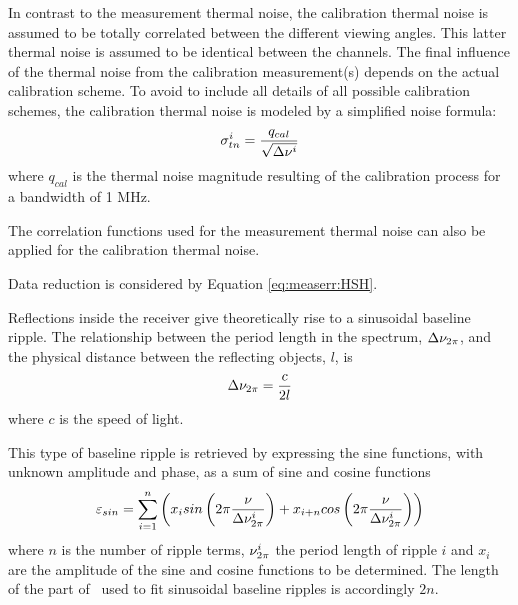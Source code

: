  \label{sec:measerr:ctn}
 
 In contrast to the measurement thermal noise, the calibration thermal
 noise is assumed to be totally correlated between the different
 viewing angles.  This latter thermal noise is assumed to be identical
 between the channels.  The final influence of the thermal noise from
 the calibration measurement(s) depends on the actual calibration
 scheme.  To avoid to include all details of all possible calibration
 schemes, the calibration thermal noise is modeled by a simplified
 noise formula:
 \begin{equation}
   \sigma_{tn}^i = \frac{q_{cal}}{\sqrt{\Delta \nu^i}}
 \end{equation}
 where $q_{cal}$ is the thermal noise magnitude resulting of the calibration
 process for a bandwidth of 1 MHz.

 The correlation functions used for the measurement thermal noise can
 also be applied for the calibration thermal noise.  
 
 Data reduction is considered by Equation \ref{eq:measerr:HSH}.
 


 \label{sec:measerr:sin}
 
 Reflections inside the receiver give theoretically rise to a
 sinusoidal baseline ripple. The relationship between the period
 length in the spectrum, $\Delta \nu_{2\pi}$, and the physical distance
 between the reflecting objects, $l$, is \citep{rohlfs:86} 
 \begin{equation}
   \Delta \nu_{2\pi} = \frac{c}{2l}
 \end{equation}
 where $c$ is the speed of light.
 
 This type of baseline ripple is retrieved by expressing the sine
 functions, with unknown amplitude and phase, as a sum of sine and
 cosine functions \citep{kuntz:97}
 \begin{equation}
   \varepsilon_{sin} = \sum_{i=1}^n \left( 
              x_i sin\left(2\pi\frac{\nu}{\Delta \nu_{2\pi}^i}\right) +
              x_{i+n} cos\left(2\pi\frac{\nu}{\Delta \nu_{2\pi}^i}\right) \right)
  \label{eq:measerr:sines}
 \end{equation}
 where $n$ is the number of ripple terms, $\nu_{2\pi}^i$ the period
 length of ripple $i$ and $x_i$ are the amplitude of the sine and
 cosine functions to be determined. The length of the part of \xt\ 
 used to fit sinusoidal baseline ripples is accordingly $2n$.
 
